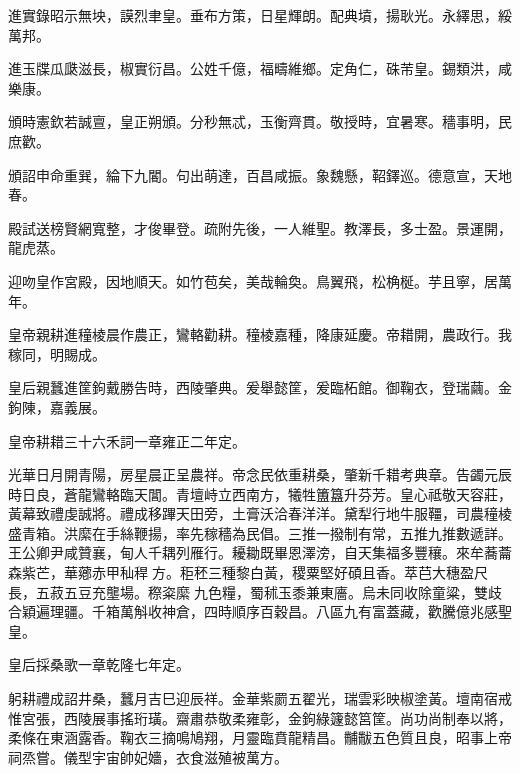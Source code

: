 \begin{pinyinscope}
進實錄昭示無坱，謨烈聿皇。垂布方策，日星輝朗。配典墳，揚耿光。永繹思，綏萬邦。

進玉牒瓜瓞滋長，椒實衍昌。公姓千億，福疇維鄉。定角仁，硃芾皇。錫類洪，咸樂康。

頒時憲欽若誠亶，皇正朔頒。分秒無忒，玉衡齊貫。敬授時，宜暑寒。穡事明，民庶歡。

頒詔申命重巽，綸下九閽。句出萌達，百昌咸振。象魏懸，鞀鐸巡。德意宣，天地春。

殿試送榜賢網寬整，才俊畢登。疏附先後，一人維聖。教澤長，多士盈。景運開，龍虎蒸。

迎吻皇作宮殿，因地順天。如竹苞矣，美哉輪奐。鳥翼飛，松桷梴。芋且寧，居萬年。

皇帝親耕進穜棱晨作農正，鸞輅勸耕。穜棱嘉種，降康延慶。帝耤開，農政行。我稼同，明賜成。

皇后親蠶進筐鉤戴勝告時，西陵肇典。爰舉懿筐，爰臨柘館。御鞠衣，登瑞繭。金鉤陳，嘉義展。

皇帝耕耤三十六禾詞一章雍正二年定。

光華日月開青陽，房星晨正呈農祥。帝念民依重耕桑，肇新千耤考典章。告蠲元辰時日良，蒼龍鸞輅臨天閶。青壇峙立西南方，犧牲簠簋升芬芳。皇心祗敬天容莊，黃幕致禮虔誠將。禮成移蹕天田旁，土膏沃洽春洋洋。黛犁行地牛服韁，司農穜棱盛青箱。洪縻在手絲鞭揚，率先稼穡為民倡。三推一撥制有常，五推九推數遞詳。王公卿尹咸贊襄，甸人千耦列雁行。耰耡既畢恩澤滂，自天集福多豐穰。來牟蕎蘥森紫芒，華薌赤甲秈稈方。秬秠三種黎白黃，稷粟堅好碩且香。萃𦬊大穗盈尺長，五菽五豆充壟場。穄粢縻九色糧，蜀秫玉黍兼東廧。烏未同收除童粱，雙歧合穎遍理疆。千箱萬斛收神倉，四時順序百穀昌。八區九有富蓋藏，歡騰億兆感聖皇。

皇后採桑歌一章乾隆七年定。

躬耕禮成詔井桑，蠶月吉巳迎辰祥。金華紫罽五翟光，瑞雲彩映椒塗黃。壇南宿戒惟宮張，西陵展事搖珩璜。齋肅恭敬柔雍彰，金鉤綠籧懿筥筐。尚功尚制奉以將，柔條在東涵露香。鞠衣三摘鳴鳩翔，月靈臨賁龍精昌。黼黻五色質且良，昭事上帝祠烝嘗。儀型宇宙帥妃嬙，衣食滋殖被萬方。


\end{pinyinscope}